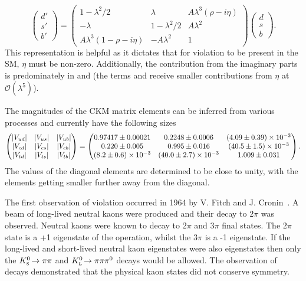 \begin{equation}
\left( \begin{array}{c} d' \\ s'  \\ b' \end{array} \right) = \begin{pmatrix} 1 - \lambda^2/2 & \lambda & A\lambda^3(\rho-i\eta) \\ -\lambda & 1-\lambda^2/2 & A\lambda^2  \\ A\lambda^3(1-\rho-i\eta) & -A\lambda^2 & 1 \end{pmatrix} \left( \begin{array}{c} d \\ s  \\ b \end{array} \right).
\end{equation}
This representation is helpful as it dictates that for \CP violation to be present in the SM, $\eta$ must be non-zero. Additionally, the contribution from the imaginary parts is predominately in \Vub and \Vtd (the terms \Vcd and \Vts receive smaller contributions from $\eta$ at $\mathcal{O}(\lambda^{5})$). 

The magnitudes of the CKM matrix elements can be inferred from various processes and currently have the following sizes~\cite{PDG2016}
\begin{equation} 
    \begin{pmatrix} 
        |{V_{{u}{d}}}| & |{V_{{u}{s}}}| & |{V_{{u}{b}}}| \\ 
        |{V_{{c}{d}}}| & |{V_{{c}{s}}}| & |{V_{{c}{b}}}|  \\
        |{V_{{t}{d}}}| & |{V_{{t}{s}}}| & |{V_{{t}{b}}}| 
    \end{pmatrix}
    =
    \begin{pmatrix} 
        0.97417\pm0.00021        & 0.2248\pm0.0006           & (4.09\pm0.39)\times10^{-3}\\ 
        0.220\pm0.005            & 0.995\pm0.016             & (40.5\pm1.5)\times10^{-3} \\
        (8.2\pm0.6)\times10^{-3} & (40.0\pm2.7)\times10^{-3} & 1.009\pm0.031            
    \end{pmatrix}.
\end{equation}
The values of the diagonal elements are determined to be close to unity, with the elements getting smaller further away from the diagonal.

The first observation of \CP violation occurred in 1964 by V. Fitch and J. Cronin~\cite{PhysRevLett.13.138}.  
A beam of long-lived neutral kaons were produced and their decay to $2\pi$ was observed. Neutral kaons were known to decay to $2\pi$ and $3\pi$ final states. The $2\pi$ state is a +1 eigenstate of the \CP operation, whilst the $3\pi$ is a -1 eigenstate. If the long-lived and short-lived neutral kaon eigenstates were also \CP eigenstates then only the ${{K}^0_{\mathrm{ \scriptscriptstyle S}}}\!\rightarrow \pi\pi$ and ${{K}^0_{\mathrm{ \scriptscriptstyle L}}}\!\rightarrow \pi\pi{\ensuremath{{\pi}^0}}$ decays would be allowed. The observation of \decay{\KL}{\pip\pim} decays demonstrated that the physical kaon states did not conserve \CP symmetry. 

